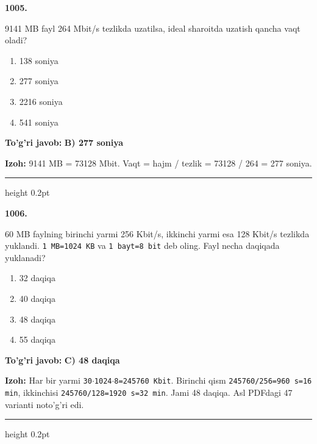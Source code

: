 \documentclass[10pt,a4paper,oneside]{article}
\begin{document}
\noindent\textbf{\color{ink}1005.}
\par
9141 MB fayl 264 Mbit/s tezlikda uzatilsa, ideal sharoitda uzatish qancha vaqt oladi?
\begin{enumerate}[label=\Alph*),leftmargin=9mm]
\item 138 soniya
\item 277 soniya
\item 2216 soniya
\item 541 soniya
\end{enumerate}
\begin{tcolorbox}[enhanced,breakable,colback=teal!4,colframe=teal!50!black,boxrule=0.5pt,arc=1.1mm,left=3mm,right=3mm,top=1.7mm,bottom=1.7mm,before skip=2mm,after skip=2mm]
\textbf{\color{teal}To'g'ri javob:} \textbf{B) 277 soniya}
\par\smallskip
\textbf{Izoh:} 9141 MB = 73128 Mbit. Vaqt = hajm / tezlik = 73128 / 264 = 277 soniya.
\end{tcolorbox}
\vspace{2mm}\hrule height 0.2pt \vspace{3mm}

\noindent\textbf{\color{ink}1006.}
\par
60 MB faylning birinchi yarmi 256 Kbit/s, ikkinchi yarmi esa 128 Kbit/s tezlikda yuklandi. \texttt{1 MB=1024 KB} va \texttt{1 bayt=8 bit} deb oling. Fayl necha daqiqada yuklanadi?
\begin{enumerate}[label=\Alph*),leftmargin=9mm]
\item 32 daqiqa
\item 40 daqiqa
\item 48 daqiqa
\item 55 daqiqa
\end{enumerate}
\begin{tcolorbox}[enhanced,breakable,colback=teal!4,colframe=teal!50!black,boxrule=0.5pt,arc=1.1mm,left=3mm,right=3mm,top=1.7mm,bottom=1.7mm,before skip=2mm,after skip=2mm]
\textbf{\color{teal}To'g'ri javob:} \textbf{C) 48 daqiqa}
\par\smallskip
\textbf{Izoh:} Har bir yarmi \texttt{30\ensuremath{\cdot}1024\ensuremath{\cdot}8=245760 Kbit}. Birinchi qism \texttt{245760/256=960 s=16 min}, ikkinchisi \texttt{245760/128=1920 s=32 min}. Jami 48 daqiqa. Asl PDFdagi 47 varianti noto'g'ri edi.
\end{tcolorbox}
\vspace{2mm}\hrule height 0.2pt \vspace{3mm}
\end{document}
